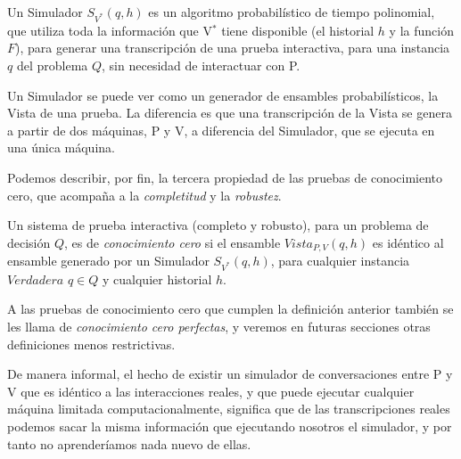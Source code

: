 \begin{definition}
	Un Simulador $S_{V^*}(q,h)$ es un algoritmo probabilístico de tiempo polinomial, que utiliza toda la información que V$^*$ tiene disponible (el historial $h$ y la función $F$), para generar una transcripción de una prueba interactiva, para una instancia $q$ del problema $Q$, sin necesidad de interactuar con P.
\end{definition}

Un Simulador se puede ver como un generador de ensambles probabilísticos, la Vista de una prueba. La diferencia es que una transcripción de la Vista se genera a partir de dos máquinas, P y V, a diferencia del Simulador, que se ejecuta en una única máquina.


\hfil

Podemos describir, por fin, la tercera propiedad de las pruebas de conocimiento cero, que acompaña a la \textit{completitud} y la \textit{robustez}.



\begin{definition}	
	Un sistema de prueba interactiva (completo y robusto), para un problema de decisión $Q$, es de \textit{conocimiento cero} si el ensamble $Vista_{P,V}(q,h)$ es idéntico al ensamble generado por un Simulador $S_{V^*}(q,h)$, para cualquier instancia $Verdadera$ $q\in Q$ y cualquier historial $h$.
\end{definition}

A las pruebas de conocimiento cero que cumplen la definición anterior también se les llama de \textit{conocimiento cero perfectas}, y veremos en futuras secciones otras definiciones menos restrictivas.



De manera informal, el hecho de existir un simulador de conversaciones entre P y V que es idéntico a las interacciones reales, y que puede ejecutar cualquier máquina limitada computacionalmente, significa que de las transcripciones reales podemos sacar la misma información que ejecutando nosotros el simulador, y por tanto no aprenderíamos nada nuevo de ellas.



